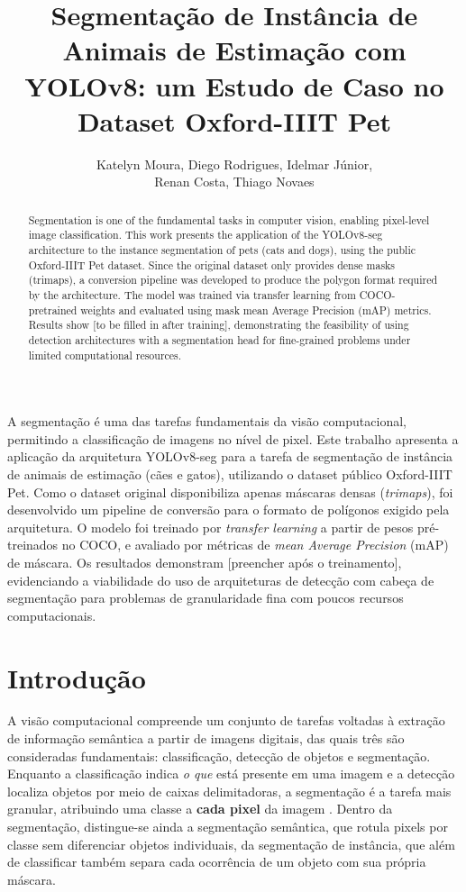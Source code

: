 \documentclass[12pt]{article}
\title{Segmentação de Instância de Animais de Estimação com YOLOv8: um Estudo de Caso no Dataset Oxford-IIIT Pet}
\author{Katelyn Moura, Diego Rodrigues, Idelmar Júnior,\\ Renan Costa, Thiago Novaes}
\begin{document}
\maketitle

\begin{resumo}
  A segmentação é uma das tarefas fundamentais da visão computacional, permitindo a
  classificação de imagens no nível de pixel. Este trabalho apresenta a aplicação da
  arquitetura YOLOv8-seg para a tarefa de segmentação de instância de animais de
  estimação (cães e gatos), utilizando o dataset público Oxford-IIIT Pet. Como o dataset
  original disponibiliza apenas máscaras densas (\textit{trimaps}), foi desenvolvido um
  pipeline de conversão para o formato de polígonos exigido pela arquitetura. O modelo foi
  treinado por \textit{transfer learning} a partir de pesos pré-treinados no COCO, e avaliado
  por métricas de \textit{mean Average Precision} (mAP) de máscara. Os resultados demonstram
  [preencher após o treinamento], evidenciando a viabilidade do uso de arquiteturas de
  detecção com cabeça de segmentação para problemas de granularidade fina com poucos
  recursos computacionais.
\end{resumo}

\begin{abstract}
  Segmentation is one of the fundamental tasks in computer vision, enabling pixel-level
  image classification. This work presents the application of the YOLOv8-seg architecture
  to the instance segmentation of pets (cats and dogs), using the public Oxford-IIIT Pet
  dataset. Since the original dataset only provides dense masks (trimaps), a conversion
  pipeline was developed to produce the polygon format required by the architecture. The
  model was trained via transfer learning from COCO-pretrained weights and evaluated using
  mask mean Average Precision (mAP) metrics. Results show [to be filled in after training],
  demonstrating the feasibility of using detection architectures with a segmentation head
  for fine-grained problems under limited computational resources.
\end{abstract}


\section{Introdução}

A visão computacional compreende um conjunto de tarefas voltadas à extração de informação
semântica a partir de imagens digitais, das quais três são consideradas fundamentais:
classificação, detecção de objetos e segmentação. Enquanto a classificação indica \textit{o
que} está presente em uma imagem e a detecção localiza objetos por meio de caixas
delimitadoras, a segmentação é a tarefa mais granular, atribuindo uma classe a \textbf{cada
pixel} da imagem \cite{ronneberger2015unet}. Dentro da segmentação, distingue-se ainda a
segmentação semântica, que rotula pixels por classe sem diferenciar objetos individuais, da
segmentação de instância, que além de classificar também separa cada ocorrência de um
objeto com sua própria máscara.
\end{document}

